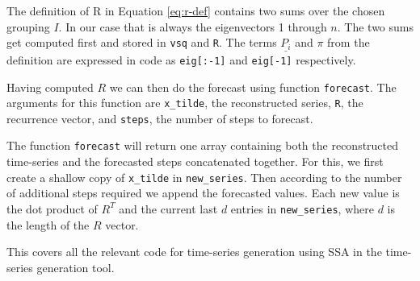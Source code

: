 The definition of R in Equation \eqref{eq:r-def} contains two sums over the chosen grouping $I$. In our case that is always the eigenvectors 1 through $n$. The two sums get computed first and stored in \texttt{vsq} and \texttt{R}. The terms $\underline{P_i}$ and $\pi$ from the definition are expressed in code as \texttt{eig[:-1]} and \texttt{eig[-1]} respectively. 

Having computed $R$ we can then do the forecast using function \texttt{forecast}. The arguments for this function are \texttt{x\_tilde}, the reconstructed series, \texttt{R}, the recurrence vector, and \texttt{steps}, the number of steps to forecast. 


The function \texttt{forecast} will return one array containing both the reconstructed time-series and the forecasted steps concatenated together. For this, we first create a shallow copy of \texttt{x\_tilde} in \texttt{new\_series}. Then according to the number of additional steps required we append the forecasted values. Each new value is the dot product of $R^T$ and the current last $d$ entries in \texttt{new\_series}, where $d$ is the length of the $R$ vector. 

This covers all the relevant code for time-series generation using SSA in the time-series generation tool. 